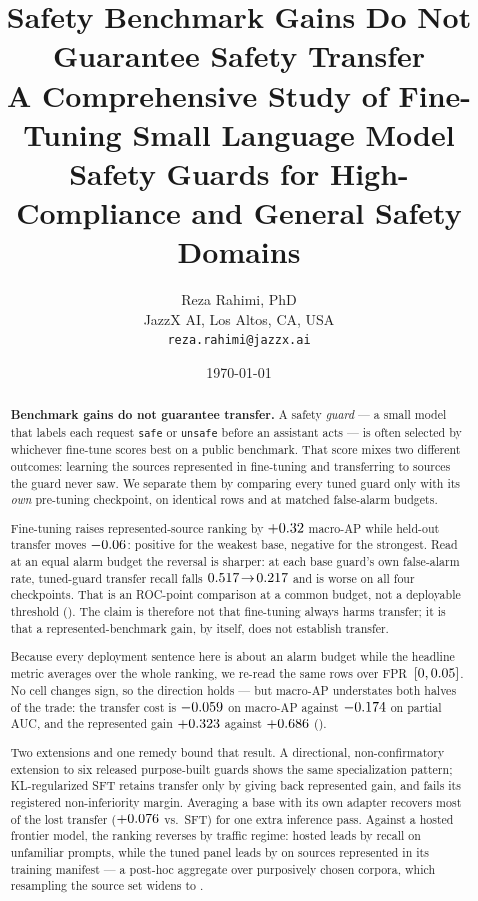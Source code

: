 \documentclass[11pt]{article}
\title{\textbf{Safety Benchmark Gains Do Not Guarantee Safety Transfer}\\[3pt]
\large A Comprehensive Study of Fine-Tuning Small Language Model Safety Guards for High-Compliance and General Safety Domains}
\author{Reza Rahimi, PhD\\\small JazzX AI, Los Altos, CA, USA \\ \small\texttt{reza.rahimi@jazzx.ai}}
\date{\vspace{-1.4ex}\small\today}
\newcommand{\code}[1]{\texttt{\small #1}}
\begin{document}
\maketitle

\begin{abstract}
\noindent \textbf{Benchmark gains do not guarantee transfer.} A safety \emph{guard} --- a small model
that labels each request \code{safe} or \code{unsafe} before an assistant acts --- is often selected by
whichever fine-tune scores best on a public benchmark. That score mixes two different outcomes: learning
the sources represented in fine-tuning and transferring to sources the guard never saw. We separate them
by comparing every tuned guard only with its \emph{own} pre-tuning checkpoint, on identical rows and at
matched false-alarm budgets.

\smallskip
\noindent Fine-tuning raises represented-source ranking by $+0.32$ macro-AP while held-out
transfer moves $-0.06$: positive for the weakest base, negative for the strongest. Read at an
equal alarm budget the reversal is sharper: at each base guard's own false-alarm rate, tuned-guard
transfer recall falls $0.517\!\rightarrow\!0.217$ and is worse on all four
checkpoints. That is an ROC-point comparison at a common budget, not a deployable threshold
(). The
claim is therefore not that fine-tuning always harms transfer; it is that a represented-benchmark gain,
by itself, does not establish transfer.

\smallskip
\noindent Because every deployment sentence here is about an alarm budget while the headline metric
averages over the whole ranking, we re-read the same rows over FPR~$[0,0.05]$. No cell changes
sign, so the direction holds --- but macro-AP understates both halves of the trade: the transfer cost
is $-0.059$ on macro-AP against $-0.174$ on partial AUC, and the represented
gain $+0.323$ against $+0.686$ ().

\smallskip
\noindent Two extensions and one remedy bound that result. A directional, non-confirmatory extension to
six released purpose-built guards shows the same specialization pattern; KL-regularized SFT retains
transfer only by giving back represented gain, and fails its registered non-inferiority margin. Averaging
a base with its own adapter recovers most of the lost transfer ($+0.076$ vs.\ SFT) for one
extra inference pass. Against a hosted frontier model, the ranking reverses by traffic regime: hosted
leads by \FrontierGainOverBase{} \FrontierGainOverBaseCI{} recall on unfamiliar prompts, while the tuned
panel leads by \HtwoAggDeltaTpr{} \HtwoAggDeltaTprCI{} on sources represented in its training manifest
--- a post-hoc aggregate over \HtwoNRepSources{} purposively chosen corpora, which resampling the
source set widens to \HtwoAggSrcResampledCI.


\end{abstract}
\end{document}
